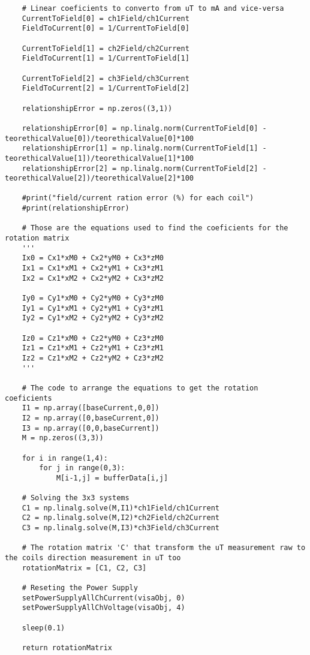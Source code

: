 \begin{verbatim}
    # Linear coeficients to converto from uT to mA and vice-versa
    CurrentToField[0] = ch1Field/ch1Current
    FieldToCurrent[0] = 1/CurrentToField[0]
    
    CurrentToField[1] = ch2Field/ch2Current
    FieldToCurrent[1] = 1/CurrentToField[1]
    
    CurrentToField[2] = ch3Field/ch3Current
    FieldToCurrent[2] = 1/CurrentToField[2]
    
    relationshipError = np.zeros((3,1))
    
    relationshipError[0] = np.linalg.norm(CurrentToField[0] - teorethicalValue[0])/teorethicalValue[0]*100
    relationshipError[1] = np.linalg.norm(CurrentToField[1] - teorethicalValue[1])/teorethicalValue[1]*100
    relationshipError[2] = np.linalg.norm(CurrentToField[2] - teorethicalValue[2])/teorethicalValue[2]*100
    
    #print("field/current ration error (%) for each coil")
    #print(relationshipError)
    
    # Those are the equations used to find the coeficients for the rotation matrix
    '''
    Ix0 = Cx1*xM0 + Cx2*yM0 + Cx3*zM0
    Ix1 = Cx1*xM1 + Cx2*yM1 + Cx3*zM1
    Ix2 = Cx1*xM2 + Cx2*yM2 + Cx3*zM2
    
    Iy0 = Cy1*xM0 + Cy2*yM0 + Cy3*zM0
    Iy1 = Cy1*xM1 + Cy2*yM1 + Cy3*zM1
    Iy2 = Cy1*xM2 + Cy2*yM2 + Cy3*zM2
    
    Iz0 = Cz1*xM0 + Cz2*yM0 + Cz3*zM0
    Iz1 = Cz1*xM1 + Cz2*yM1 + Cz3*zM1
    Iz2 = Cz1*xM2 + Cz2*yM2 + Cz3*zM2
    '''
    
    # The code to arrange the equations to get the rotation coeficients
    I1 = np.array([baseCurrent,0,0])
    I2 = np.array([0,baseCurrent,0])
    I3 = np.array([0,0,baseCurrent])
    M = np.zeros((3,3))
    
    for i in range(1,4):
        for j in range(0,3):
            M[i-1,j] = bufferData[i,j]
    
    # Solving the 3x3 systems
    C1 = np.linalg.solve(M,I1)*ch1Field/ch1Current
    C2 = np.linalg.solve(M,I2)*ch2Field/ch2Current
    C3 = np.linalg.solve(M,I3)*ch3Field/ch3Current
    
    # The rotation matrix 'C' that transform the uT measurement raw to the coils direction measurement in uT too
    rotationMatrix = [C1, C2, C3]
    
    # Reseting the Power Supply
    setPowerSupplyAllChCurrent(visaObj, 0)
    setPowerSupplyAllChVoltage(visaObj, 4)
    
    sleep(0.1)
    
    return rotationMatrix
    
\end{verbatim}
